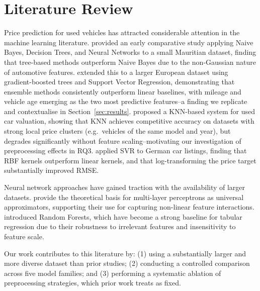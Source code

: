 \section{Literature Review}
\label{sec:literature}

Price prediction for used vehicles has attracted considerable attention in the machine learning literature.
\citet{pudaruth2014predicting} provided an early comparative study applying Naive Bayes, Decision Trees, and Neural Networks to a small Mauritian dataset, finding that tree-based methods outperform Naive Bayes due to the non-Gaussian nature of automotive features.
\citet{gegic2019car} extended this to a larger European dataset using gradient-boosted trees and Support Vector Regression, demonstrating that ensemble methods consistently outperform linear baselines, with mileage and vehicle age emerging as the two most predictive features--a finding we replicate and contextualise in Section~\ref{sec:results}.
\citet{shinde2018used} proposed a KNN-based system for used car valuation, showing that KNN achieves competitive accuracy on datasets with strong local price clusters (e.g.\ vehicles of the same model and year), but degrades significantly without feature scaling--motivating our investigation of preprocessing effects in RQ3.
\citet{listiani2009support} applied SVR to German car listings, finding that RBF kernels outperform linear kernels, and that log-transforming the price target substantially improved RMSE.

Neural network approaches have gained traction with the availability of larger datasets.
\citet{goodfellow2016deep} provide the theoretical basis for multi-layer perceptrons as universal approximators, supporting their use for capturing non-linear feature interactions.
\citet{breiman2001random} introduced Random Forests, which have become a strong baseline for tabular regression due to their robustness to irrelevant features and insensitivity to feature scale.

Our work contributes to this literature by: (1) using a substantially larger and more diverse dataset than prior studies; (2) conducting a controlled comparison across five model families; and (3) performing a systematic ablation of preprocessing strategies, which prior work treats as fixed.
